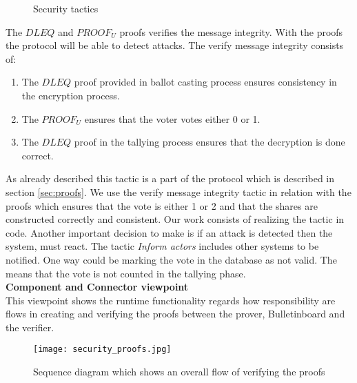 \begin{figure}[H]
\centering
  \caption{Security tactics \cite{Bass}}   
\end{figure}


The $DLEQ$ and $PROOF_U$ proofs verifies the message integrity. With the proofs the protocol will be able to detect attacks. The verify message integrity consists of:

\begin{enumerate}
    \item The $DLEQ$ proof provided in ballot casting process ensures consistency in the encryption process.
    \item  The $PROOF_U$ ensures that the voter votes either 0 or 1.
    \item  The $DLEQ$ proof in the tallying process ensures that the decryption is done correct.
\end{enumerate}

\noindent
As already described this tactic is a part of the protocol which is described in section \ref{sec:proofs}. We use the verify message integrity tactic in relation with the proofs which ensures that the vote is either 1 or 2 and that the shares are constructed correctly and consistent. Our work consists of realizing the tactic in code. Another important decision to make is if an attack is detected then the system, must react. The tactic \textit{Inform actors} includes other systems to be notified. One way could be marking the vote in the database as not valid. The means that the vote is not counted in the tallying phase.\\   

\noindent
\textbf{Component and Connector viewpoint}\\
This viewpoint shows the runtime functionality regards how responsibility are flows in creating and verifying the proofs between the prover, Bulletinboard and the verifier. 

\begin{figure}[H]
\centering
     \texttt{[image: security\_proofs.jpg]}
     \caption{Sequence diagram which shows an overall flow of verifying the proofs}     
\end{figure}


